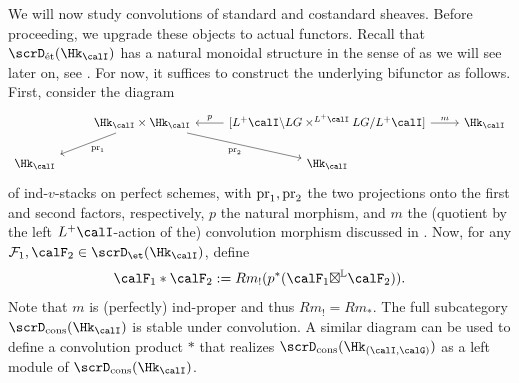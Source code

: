 \documentclass[10pt, reqno]{amsart}
\theoremstyle{plain}
\theoremstyle{definition}
\numberwithin{equation}{section}
\begin{document}
	We will now study convolutions of standard and costandard sheaves. Before proceeding, we upgrade these objects to actual functors.
	Recall that $\scrD_{\mathrm{\acute{e}t}}(\Hk_\calI)$ has a natural monoidal structure in the sense of \cite[Definition 4.1.1.10]{Lur17} as we will see later on, see . For now, it suffices to construct the underlying bifunctor as follows. First, consider the diagram
	\begin{equation}
		\begin{tikzcd}
			& {\Hk_{\calI}}\times {\Hk_{\calI}} \arrow[dl,"\mathrm{pr}_1"] \arrow[dr,"\mathrm{pr}_2",swap] &  {[L^+\calI\backslash LG\times^{L^+\calI} LG/L^+\calI]} \arrow[l,"p",swap] \arrow[r,"m"] & {\Hk_{\calI}}\\ 
			{\Hk_{\calI}} & & {\Hk_{\calI}}
		\end{tikzcd}
	\end{equation}
	of ind-$v$-stacks on perfect schemes, with $\rm{pr}_1,\rm{pr}_2$ the two projections onto the first and second factors, respectively, $p$ the natural  morphism, and $m$ the (quotient by the left $L^+\calI$-action of the) convolution morphism discussed in . Now, for any $\mathcal{F}_1,\calF_2\in \scrD_\et(\Hk_{\calI})$,  define
	\begin{equation}
		\calF_1\ast \calF_2:=Rm_!(p^*(\calF_1{\boxtimes}^\mathbb{L}\calF_2)).
	\end{equation}
	Note that $m$ is (perfectly) ind-proper and thus $Rm_!=Rm_\ast$. The full subcategory $\scrD_{\mathrm{cons}}(\Hk_{\calI})$ is stable under convolution. A similar diagram can be used to define a convolution product $\ast$ that realizes $\scrD_{\mathrm{cons}}(\Hk_{(\calI,\calG)})$ as a left module of $\scrD_{\mathrm{cons}}(\Hk_{\calI})$.
	
\end{document}

